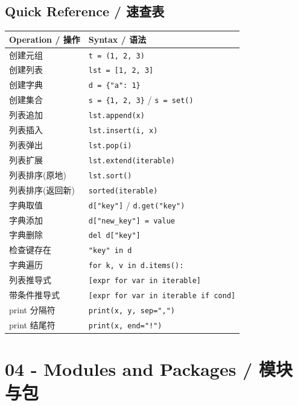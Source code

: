 \documentclass[11pt,a4paper]{report}
\let\oldtexttt\texttt
\renewcommand{\texttt}[1]{\textcolor{mainblue}{\oldtexttt{#1}}}
\begin{document}
\section{Quick Reference / 速查表}

\medskip
\centering
\small
\renewcommand{\arraystretch}{1.3}
\begin{tabular}{@{}ll@{}}
\toprule
\textbf{Operation / 操作} & \textbf{Syntax / 语法} \\ \midrule
创建元组 & \texttt{t = (1, 2, 3)} \\
创建列表 & \texttt{lst = [1, 2, 3]} \\
创建字典 & \texttt{d = \{"a": 1\}} \\
创建集合 & \texttt{s = \{1, 2, 3\}} / \texttt{s = set()} \\
列表追加 & \texttt{lst.append(x)} \\
列表插入 & \texttt{lst.insert(i, x)} \\
列表弹出 & \texttt{lst.pop(i)} \\
列表扩展 & \texttt{lst.extend(iterable)} \\
列表排序(原地) & \texttt{lst.sort()} \\
列表排序(返回新) & \texttt{sorted(iterable)} \\
字典取值 & \texttt{d["key"]} / \texttt{d.get("key")} \\
字典添加 & \texttt{d["new\_key"] = value} \\
字典删除 & \texttt{del d["key"]} \\
检查键存在 & \texttt{"key" in d} \\
字典遍历 & \texttt{for k, v in d.items():} \\
列表推导式 & \texttt{[expr for var in iterable]} \\
带条件推导式 & \texttt{[expr for var in iterable if cond]} \\
print 分隔符 & \texttt{print(x, y, sep=",")} \\
print 结尾符 & \texttt{print(x, end="!")} \\ \bottomrule
\end{tabular}
\medskip



\chapter{04 - Modules and Packages / 模块与包}
\end{document}
